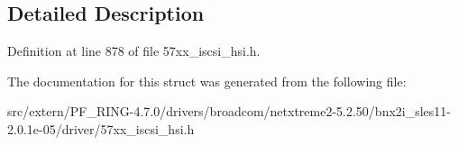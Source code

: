 \subsection{Detailed Description}


Definition at line 878 of file 57xx\_\-iscsi\_\-hsi.h.



The documentation for this struct was generated from the following file:\begin{DoxyCompactItemize}
\item 
src/extern/PF\_\-RING-\/4.7.0/drivers/broadcom/netxtreme2-\/5.2.50/bnx2i\_\-sles11-\/2.0.1e-\/05/driver/57xx\_\-iscsi\_\-hsi.h\end{DoxyCompactItemize}
